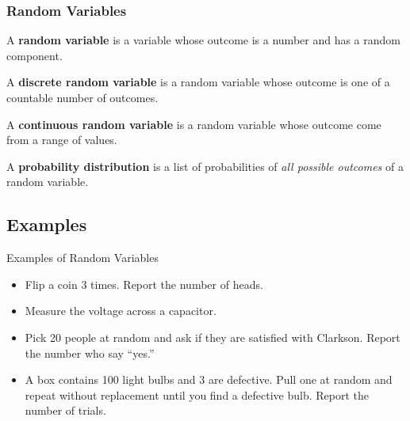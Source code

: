\begin{frame}
  \frametitle{Random Variables}

  \begin{definition}
    A \textbf{random variable} is a variable whose outcome is a number
    and has a random component.
  \end{definition}

  {
    \begin{definition}
      A \textbf{discrete random variable} is a random variable whose
      outcome is one of a countable number of outcomes.
    \end{definition}
  }


  {
    \begin{definition}
      A \textbf{continuous random variable} is a random variable whose
      outcome come from a range of values.
    \end{definition}
  }

  {
    \begin{definition}
      A \textbf{probability distribution} is a list of probabilities of
      \textit{all possible outcomes} of a random variable.
    \end{definition}
  }

\end{frame}

\subsection{Examples}

\begin{frame}{Examples of Random Variables}

  \begin{itemize}
  \item Flip a coin 3 times. Report the number of heads.
  \item Measure the voltage across a capacitor.
  \item Pick 20 people at random and ask if they are satisfied with
    Clarkson. Report the number who say ``yes.''
  \item A box contains 100 light bulbs and 3 are defective. Pull one
    at random and repeat without replacement until you find a
    defective bulb. Report the number of trials.
  \end{itemize}
  
\end{frame}



